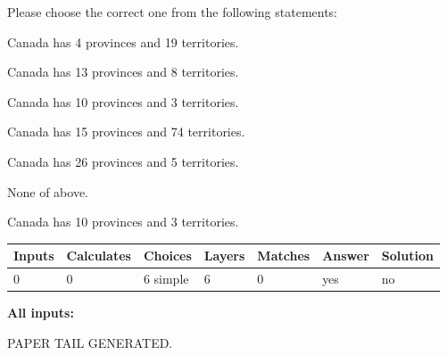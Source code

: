 \documentclass[12pt]{article}
\begin{document}
  
Please choose the correct one from the following statements:
 
 
Canada has   4 provinces and  19 territories.
 
 
Canada has  13 provinces and  8 territories.
 
 
Canada has 10  provinces and 3 territories.
 
 
Canada has  15 provinces and  74 territories.
 
 
Canada has  26 provinces and  5 territories.
 
 
 None of above.
 
 
\noindent{}
 
 
Canada has 10  provinces and 3 territories.
 
 
\noindent{}
 
 
   
   
   
   
\noindent\begin{tabular}{|l|l|l|l|l|l|l|}
 \hline
Inputs & Calculates & Choices & Layers & Matches & Answer & Solution \\ \hline
 0  & 
 0  & 
 6
  simple  
  & 
 6  & 
 0  & 
  yes & 
  no 
  \\ \hline
 \end{tabular}
   
   
   
   
\noindent{}
   
   
   
   
\noindent\vspace{0.1in}\hspace{-0.08in} {\textbf{\Large{All inputs: }}}
   
   
   
   
   
   
 \vspace{0.2in}
 
   
   
\vspace{2.0in} PAPER TAIL GENERATED.
   
   
   
\end{document}
